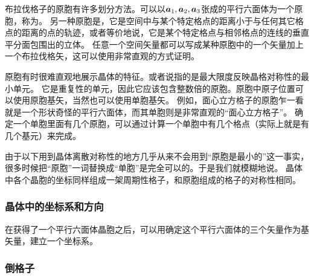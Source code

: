 布拉伐格子的原胞有许多划分方法。可以以$\vb*{a}_1, \vb*{a}_2, \vb*{a}_3$张成的平行六面体为一个原胞，称为。
另一种原胞是，它是空间中与某个特定格点的距离小于与任何其它格点的距离的点的轨迹，或者等价地说，它是某个特定格点与相邻格点的连线的垂直平分面包围出的立体。
任意一个空间矢量都可以写成某种原胞中的一个矢量加上一个布拉伐格矢，这可以使用非常直观的方式证明。

原胞有时很难直观地展示晶体的特征。或者说指的是最大限度反映晶格对称性的最小单元。
它是重复性的单元，因此它应该包含整数倍的原胞。原胞中原子位置可以使用原胞基矢，当然也可以使用单胞基矢。
例如，面心立方格子的原胞乍一看就是一个形状奇怪的平行六面体，而其单胞则是非常直观的“面心立方格子”。
确定一个单胞里面有几个原胞，可以通过计算一个单胞中有几个格点（实际上就是有几个基元）来完成。

由于以下用到晶体离散对称性的地方几乎从来不会用到“原胞是最小的”这一事实，很多时候把“原胞”一词替换成“单胞”是完全可以的。于是我们就模糊地说。
晶体中各个晶胞的坐标同样组成一架周期性格子，和原胞组成的格子的对称性相同。

\subsubsection{晶体中的坐标系和方向}


在获得了一个平行六面体晶胞之后，可以用确定这个平行六面体的三个矢量作为基矢量，建立一个坐标系。

\subsubsection{倒格子}

